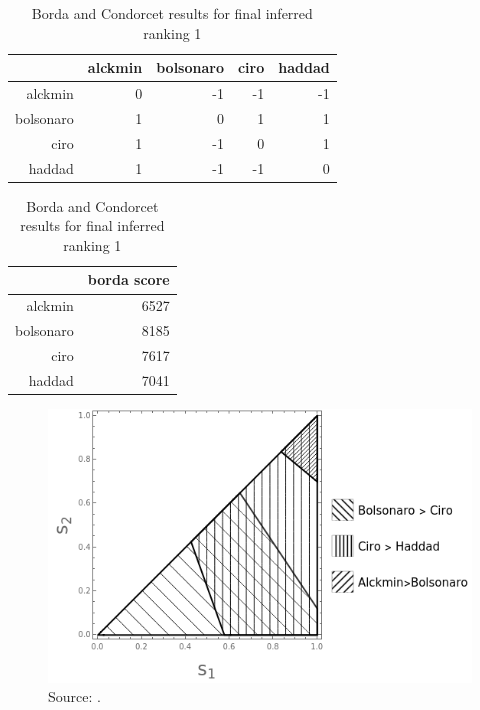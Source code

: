 \documentclass[hidelinks,11pt]{article}
\begin{document}
\begin{table}[h]
\begin{subtable}[h]{0.4\textwidth}
\centering
\begin{tabular}{rrrrr}
  \hline
 & alckmin & bolsonaro & ciro & haddad \\
  \hline
alckmin & 0 & -1 & -1 & -1 \\
  bolsonaro & 1 & 0 & 1 & 1 \\
  ciro & 1 & -1 & 0 & 1 \\
  haddad & 1 & -1 & -1 & 0 \\
   \hline
\end{tabular}
\caption{Pairwise Majority Comparisons}
\label{tbl:subtab1}
\end{subtable}
\hfill
\begin{subtable}[h]{0.4\textwidth}
  \centering
\begin{tabular}{rr}
  \hline
 & borda score \\
  \hline
alckmin & 6527 \\
  bolsonaro & 8185 \\
  ciro & 7617 \\
  haddad & 7041 \\
   \hline
\end{tabular}
\caption{Borda scores}
\label{tbl:subtab2}
\end{subtable}
\caption{Borda and Condorcet results for final inferred ranking 1}
\label{tbl:tab1}
\end{table}


\begin{figure}[H]
 \centering
 \includegraphics[width=\columnwidth,
 height=0.3\textheight]{./images/positional_results.png}
 \caption{Source: \textcite{nurmi2002voting}.}
 \label{fig:positional4c}
\end{figure}
\end{document}
